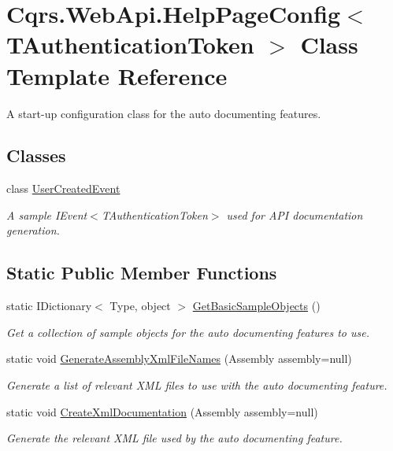\hypertarget{classCqrs_1_1WebApi_1_1HelpPageConfig}{}\section{Cqrs.\+Web\+Api.\+Help\+Page\+Config$<$ T\+Authentication\+Token $>$ Class Template Reference}
\label{classCqrs_1_1WebApi_1_1HelpPageConfig}


A start-\/up configuration class for the auto documenting features.  


\subsection*{Classes}
\begin{DoxyCompactItemize}
\item 
class \hyperlink{classCqrs_1_1WebApi_1_1HelpPageConfig_1_1UserCreatedEvent}{User\+Created\+Event}
\begin{DoxyCompactList}\small\item\em A sample I\+Event$<$\+T\+Authentication\+Token$>$ used for A\+PI documentation generation. \end{DoxyCompactList}\end{DoxyCompactItemize}
\subsection*{Static Public Member Functions}
\begin{DoxyCompactItemize}
\item 
static I\+Dictionary$<$ Type, object $>$ \hyperlink{classCqrs_1_1WebApi_1_1HelpPageConfig_a9015771102b0ab21da20a0684fe6a88a_a9015771102b0ab21da20a0684fe6a88a}{Get\+Basic\+Sample\+Objects} ()
\begin{DoxyCompactList}\small\item\em Get a collection of sample objects for the auto documenting features to use. \end{DoxyCompactList}\item 
static void \hyperlink{classCqrs_1_1WebApi_1_1HelpPageConfig_a36bf3691c8b3cbe26fa3e72456170271_a36bf3691c8b3cbe26fa3e72456170271}{Generate\+Assembly\+Xml\+File\+Names} (Assembly assembly=null)
\begin{DoxyCompactList}\small\item\em Generate a list of relevant X\+ML files to use with the auto documenting feature. \end{DoxyCompactList}\item 
static void \hyperlink{classCqrs_1_1WebApi_1_1HelpPageConfig_a1596c74d98fd628b646885dcac056cc1_a1596c74d98fd628b646885dcac056cc1}{Create\+Xml\+Documentation} (Assembly assembly=null)
\begin{DoxyCompactList}\small\item\em Generate the relevant X\+ML file used by the auto documenting feature. \end{DoxyCompactList}\end{DoxyCompactItemize}
